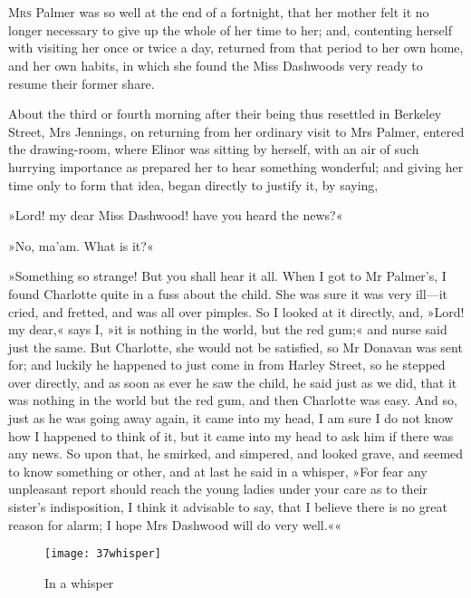 \chapter[Chapter \thechapter]{}
\lettrine[lines=4,lraise=0.3]{M}{rs} Palmer was so well at the end of a fortnight, that her mother felt it no longer necessary to give up the whole of her time to her; and, contenting herself with visiting her once or twice a day, returned from that period to her own home, and her own habits, in which she found the Miss Dashwoods very ready to resume their former share.

About the third or fourth morning after their being thus resettled in Berkeley Street, Mrs Jennings, on returning from her ordinary visit to Mrs Palmer, entered the drawing-room, where Elinor was sitting by herself, with an air of such hurrying importance as prepared her to hear something wonderful; and giving her time only to form that idea, began directly to justify it, by saying,

»Lord! my dear Miss Dashwood! have you heard the news?«

»No, ma’am. What is it?«

»Something so strange! But you shall hear it all. When I got to Mr Palmer’s, I found Charlotte quite in a fuss about the child. She was sure it was very ill—it cried, and fretted, and was all over pimples. So I looked at it directly, and, »Lord! my dear,« says I, »it is nothing in the world, but the red gum;« and nurse said just the same. But Charlotte, she would not be satisfied, so Mr Donavan was sent for; and luckily he happened to just come in from Harley Street, so he stepped over directly, and as soon as ever he saw the child, he said just as we did, that it was nothing in the world but the red gum, and then Charlotte was easy. And so, just as he was going away again, it came into my head, I am sure I do not know how I happened to think of it, but it came into my head to ask him if there was any news. So upon that, he smirked, and simpered, and looked grave, and seemed to know something or other, and at last he said in a whisper, »For fear any unpleasant report should reach the young ladies under your care as to their sister’s indisposition, I think it advisable to say, that I believe there is no great reason for alarm; I hope Mrs Dashwood will do very well.««

\begin{figure}[tbph]
\centering
\texttt{[image: 37whisper]}
\caption{In a whisper}
\end{figure}

